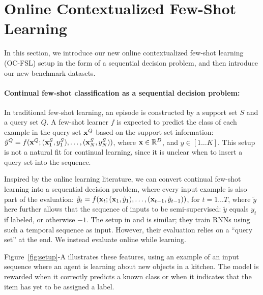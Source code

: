 
\section{Online Contextualized Few-Shot Learning}
\vspace{-0.1in}
\label{sec:benchmark}
In this section, we introduce our new online contextualized few-shot learning (OC-FSL) setup in the
form of a sequential decision problem, and then introduce our new benchmark datasets.

\vspace{-0.1in}
\paragraph{Continual few-shot classification as a sequential decision problem:}
In traditional few-shot learning, an episode is constructed by a support set $S$ and a query set
$Q$. A few-shot learner $f$ is expected to predict the class of each example in the query set
$\mathbf{x}^Q$ based on the support set information: $\hat{y}^Q = f(\mathbf{x}^Q; (\mathbf{x}^S_1, y^S_1), \dots,
(\mathbf{x}^S_N, y^S_N))$, where $\mathbf{x} \in \mathbb{R}^D$, and $y \in [1 \dots K]$. This setup is not a natural fit for continual learning, since it is unclear when
to insert a query set into the sequence.

Inspired by the online learning literature, we can convert continual few-shot learning into a
sequential decision problem, where every input example is also part of the evaluation: $\hat{y}_t =
f(\mathbf{x}_t; (\mathbf{x}_1, \tilde{y}_1), \dots, (\mathbf{x}_{t-1}, \tilde{y}_{t-1}))$, for $t = 1 \dots T$, where
$\tilde{y}$ here further allows that the sequence of inputs to be semi-supervised: $\tilde{y}$
equals $y_t$ if labeled, or otherwise $-1$. The setup in \citet{mann} and \citet{rareevent} is
similar; they train RNNs using such a temporal sequence as input. However, their evaluation relies
on a ``query set'' at the end. We instead evaluate online while learning.

Figure~\ref{fig:setup}-A illustrates these features, using an example of an input sequence where an
agent is learning about new objects in a kitchen. The model is rewarded when it correctly predicts a
known class or when it indicates that the item has yet to be assigned a label.

\vspace{-0.1in}
